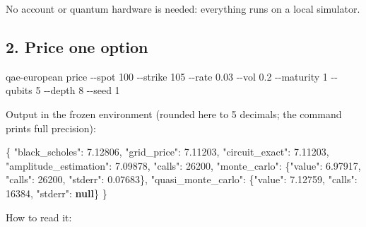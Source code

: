 \documentclass[
  10pt,
]{article}
\newenvironment{Shaded}{}{}
\newcommand{\AttributeTok}[1]{\textcolor[rgb]{0.49,0.56,0.16}{#1}}
\newcommand{\DataTypeTok}[1]{\textcolor[rgb]{0.56,0.13,0.00}{#1}}
\newcommand{\DecValTok}[1]{\textcolor[rgb]{0.25,0.63,0.44}{#1}}
\newcommand{\ExtensionTok}[1]{#1}
\newcommand{\FloatTok}[1]{\textcolor[rgb]{0.25,0.63,0.44}{#1}}
\newcommand{\FunctionTok}[1]{\textcolor[rgb]{0.02,0.16,0.49}{#1}}
\newcommand{\KeywordTok}[1]{\textcolor[rgb]{0.00,0.44,0.13}{\textbf{#1}}}
\newcommand{\NormalTok}[1]{#1}
\begin{document}
No account or quantum hardware is needed: everything runs on a local
simulator.

\hypertarget{2-price-one-option}{%
\subsection{2. Price one option}\label{2-price-one-option}}

\begin{Shaded}
\begin{Highlighting}[]
\ExtensionTok{qae{-}european}\NormalTok{ price }\AttributeTok{{-}{-}spot}\NormalTok{ 100 }\AttributeTok{{-}{-}strike}\NormalTok{ 105 }\AttributeTok{{-}{-}rate}\NormalTok{ 0.03 }\AttributeTok{{-}{-}vol}\NormalTok{ 0.2 }\AttributeTok{{-}{-}maturity}\NormalTok{ 1 }\AttributeTok{{-}{-}qubits}\NormalTok{ 5 }\AttributeTok{{-}{-}depth}\NormalTok{ 8 }\AttributeTok{{-}{-}seed}\NormalTok{ 1}
\end{Highlighting}
\end{Shaded}

Output in the frozen environment (rounded here to 5 decimals; the
command prints full precision):

\begin{Shaded}
\begin{Highlighting}[]
\FunctionTok{\{}
  \DataTypeTok{"black\_scholes"}\FunctionTok{:} \FloatTok{7.12806}\FunctionTok{,}
  \DataTypeTok{"grid\_price"}\FunctionTok{:} \FloatTok{7.11203}\FunctionTok{,}
  \DataTypeTok{"circuit\_exact"}\FunctionTok{:} \FloatTok{7.11203}\FunctionTok{,}
  \DataTypeTok{"amplitude\_estimation"}\FunctionTok{:} \FloatTok{7.09878}\FunctionTok{,}
  \DataTypeTok{"calls"}\FunctionTok{:} \DecValTok{26200}\FunctionTok{,}
  \DataTypeTok{"monte\_carlo"}\FunctionTok{:} \FunctionTok{\{}\DataTypeTok{"value"}\FunctionTok{:} \FloatTok{6.97917}\FunctionTok{,} \DataTypeTok{"calls"}\FunctionTok{:} \DecValTok{26200}\FunctionTok{,} \DataTypeTok{"stderr"}\FunctionTok{:} \FloatTok{0.07683}\FunctionTok{\},}
  \DataTypeTok{"quasi\_monte\_carlo"}\FunctionTok{:} \FunctionTok{\{}\DataTypeTok{"value"}\FunctionTok{:} \FloatTok{7.12759}\FunctionTok{,} \DataTypeTok{"calls"}\FunctionTok{:} \DecValTok{16384}\FunctionTok{,} \DataTypeTok{"stderr"}\FunctionTok{:} \KeywordTok{null}\FunctionTok{\}}
\FunctionTok{\}}
\end{Highlighting}
\end{Shaded}

How to read it:
\end{document}
